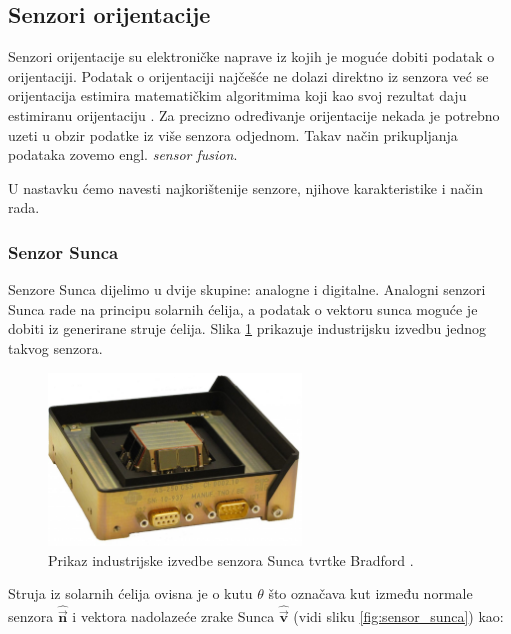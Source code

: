 \documentclass[times, utf8, diplomski, numeric]{templates/template}
\begin{document}
{{        \subsection{Senzori orijentacije}{
        \label{subsection:senzori_orijentacije}
            Senzori orijentacije su elektroničke naprave iz kojih je moguće dobiti podatak o orijentaciji. Podatak o orijentaciji najčešće ne dolazi direktno iz senzora već se orijentacija estimira matematičkim algoritmima koji kao svoj rezultat daju estimiranu orijentaciju \cite{adcsKnjiga}. Za precizno određivanje orijentacije nekada je potrebno uzeti u obzir podatke iz više senzora odjednom. Takav način prikupljanja podataka zovemo engl. \emph{sensor fusion}. 

            U nastavku ćemo navesti najkorištenije senzore, njihove karakteristike i način rada.

            \subsubsection{Senzor Sunca}{
                Senzore Sunca dijelimo u dvije skupine: analogne i digitalne. Analogni senzori Sunca rade na principu solarnih ćelija, a podatak o vektoru sunca moguće je dobiti iz generirane struje ćelija. Slika \ref{fig:sensor_sunca_industrija} prikazuje industrijsku izvedbu jednog takvog senzora.

                \begin{figure}[htb]
                \centering
                \includegraphics[width=0.6\textwidth]{images/sensor_sunca_industrija.jpg}
                \caption{Prikaz industrijske izvedbe senzora Sunca tvrtke Bradford \cite{sunSensorBradford}.}
                \label{fig:sensor_sunca_industrija}
                \end{figure}

                Struja iz solarnih ćelija ovisna je o kutu $\theta$ što označava kut između normale senzora $\hat{\overrightarrow{\boldsymbol{n}}}$ i vektora nadolazeće zrake Sunca $\hat{\overrightarrow{\boldsymbol{v}}}$ (vidi sliku \ref{fig:sensor_sunca}) kao:

}}}}
\end{document}
